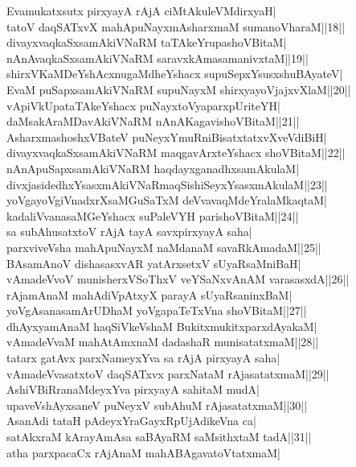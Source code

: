\documentclass{article}
\begin{document}
Evamukatxsutx pirxyayA rAjA ciMtAkuleVMdirxyaH|\\
tatoV daqSATxvX mahApuNayxmAsharxmaM sumanoVharaM||18||\\
divayxvaqkaSxsamAkiVNaRM taTAkeYrupashoVBitaM|\\
nAnAvaqkaSxsamAkiVNaRM saravxkAmasamanivxtaM||19||\\
shirxVKaMDeYshAcxnugaMdheYshacx supuSepxYsusxshuBAyateV|\\
EvaM puSapxsamAkiVNaRM supuNayxM shirxyayoVjajxvXlaM||20||\\
vApiVkUpataTAkeYshacx puNayxtoVyaparxpUriteYH|\\
daMsakAraMDavAkiVNaRM nAnAKagavishoVBitaM||21||\\
AsharxmashoshxVBateV puNeyxYmuRniBisatxtatxvXveVdiBiH|\\
divayxvaqkaSxsamAkiVNaRM maqgavArxteYshacx shoVBitaM||22||\\
nAnApuSapxsamAkiVNaRM haqdayxganadhxsamAkulaM|\\
divxjasidedhxYsasxmAkiVNaRmaqSishiSeyxYsasxmAkulaM||23||\\
yoVgayoVgiVnadxrXsaMGuSaTxM deVvavaqMdeYralaMkaqtaM|\\
kadaliVvanasaMGeYshacx suPaleVYH parishoVBitaM||24||\\
sa subAhusatxtoV rAjA tayA savxpirxyayA saha|\\
parxviveVsha mahApuNayxM naMdanaM savaRkAmadaM||25||\\
BAsamAnoV dishasasxvAR yatArxsetxV sUyaRsaMniBaH|\\
vAmadeVvoV munisherxVSoThxV veYSaNxvAnAM varasasxdA||26||\\
rAjamAnaM mahAdiVpAtxyX parayA sUyaRsaninxBaM|\\
yoVgAsanasamArUDhaM yoVgapaTeTxVna shoVBitaM||27||\\
dhAyxyamAnaM haqSiVkeVshaM BukitxmukitxparxdAyakaM|\\
vAmadeVvaM mahAtAmxnaM dadashaR munisatatxmaM||28||\\
tatarx gatAvx parxNameyxYva sa rAjA pirxyayA saha|\\
vAmadeVvasatxtoV daqSATxvx parxNataM rAjasatatxmaM||29||\\
AshiVBiRranaMdeyxYva pirxyayA sahitaM mudA|\\
upaveVshAyxsaneV puNeyxV subAhuM rAjasatatxmaM||30||\\
AsanAdi tataH pAdeyxYraGayxRpUjAdikeVna ca|\\
satAkxraM kArayAmAsa saBAyaRM saMsithxtaM tadA||31||\\
atha parxpacaCx rAjAnaM mahABAgavatoVtatxmaM|\\
\end{document}
